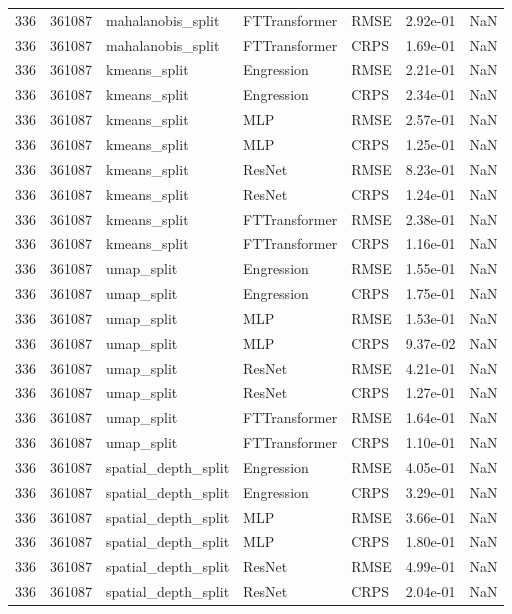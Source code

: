 \begin{tabular}{rrlllrr}
336 & 361087 & mahalanobis\_split & FTTransformer & RMSE & 2.92e-01 & NaN \\
336 & 361087 & mahalanobis\_split & FTTransformer & CRPS & 1.69e-01 & NaN \\
336 & 361087 & kmeans\_split & Engression & RMSE & 2.21e-01 & NaN \\
336 & 361087 & kmeans\_split & Engression & CRPS & 2.34e-01 & NaN \\
336 & 361087 & kmeans\_split & MLP & RMSE & 2.57e-01 & NaN \\
336 & 361087 & kmeans\_split & MLP & CRPS & 1.25e-01 & NaN \\
336 & 361087 & kmeans\_split & ResNet & RMSE & 8.23e-01 & NaN \\
336 & 361087 & kmeans\_split & ResNet & CRPS & 1.24e-01 & NaN \\
336 & 361087 & kmeans\_split & FTTransformer & RMSE & 2.38e-01 & NaN \\
336 & 361087 & kmeans\_split & FTTransformer & CRPS & 1.16e-01 & NaN \\
336 & 361087 & umap\_split & Engression & RMSE & 1.55e-01 & NaN \\
336 & 361087 & umap\_split & Engression & CRPS & 1.75e-01 & NaN \\
336 & 361087 & umap\_split & MLP & RMSE & 1.53e-01 & NaN \\
336 & 361087 & umap\_split & MLP & CRPS & 9.37e-02 & NaN \\
336 & 361087 & umap\_split & ResNet & RMSE & 4.21e-01 & NaN \\
336 & 361087 & umap\_split & ResNet & CRPS & 1.27e-01 & NaN \\
336 & 361087 & umap\_split & FTTransformer & RMSE & 1.64e-01 & NaN \\
336 & 361087 & umap\_split & FTTransformer & CRPS & 1.10e-01 & NaN \\
336 & 361087 & spatial\_depth\_split & Engression & RMSE & 4.05e-01 & NaN \\
336 & 361087 & spatial\_depth\_split & Engression & CRPS & 3.29e-01 & NaN \\
336 & 361087 & spatial\_depth\_split & MLP & RMSE & 3.66e-01 & NaN \\
336 & 361087 & spatial\_depth\_split & MLP & CRPS & 1.80e-01 & NaN \\
336 & 361087 & spatial\_depth\_split & ResNet & RMSE & 4.99e-01 & NaN \\
336 & 361087 & spatial\_depth\_split & ResNet & CRPS & 2.04e-01 & NaN \\

\end{tabular}
